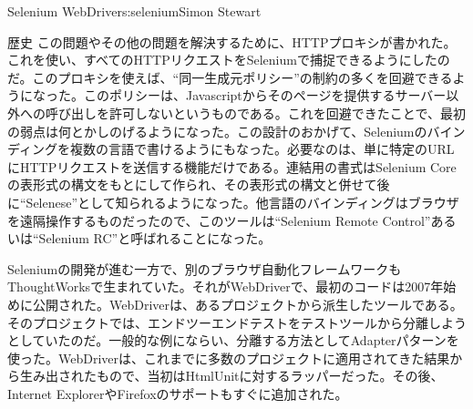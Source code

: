 \begin{aosachapter}{Selenium WebDriver}{s:selenium}{Simon Stewart}
\begin{aosasect1}{歴史}
この問題やその他の問題を解決するために、HTTPプロキシが書かれた。これを使い、すべてのHTTPリクエストをSeleniumで捕捉できるようにしたのだ。このプロキシを使えば、``同一生成元ポリシー''の制約の多くを回避できるようになった。このポリシーは、Javascriptからそのページを提供するサーバー以外への呼び出しを許可しないというものである。これを回避できたことで、最初の弱点は何とかしのげるようになった。この設計のおかげて、Seleniumのバインディングを複数の言語で書けるようにもなった。必要なのは、単に特定のURLにHTTPリクエストを送信する機能だけである。連結用の書式はSelenium Coreの表形式の構文をもとにして作られ、その表形式の構文と併せて後に``Selenese''として知られるようになった。他言語のバインディングはブラウザを遠隔操作するものだったので、このツールは``Selenium Remote Control''あるいは``Selenium RC''と呼ばれることになった。

Seleniumの開発が進む一方で、別のブラウザ自動化フレームワークもThoughtWorksで生まれていた。それがWebDriverで、最初のコードは2007年始めに公開された。WebDriverは、あるプロジェクトから派生したツールである。そのプロジェクトでは、エンドツーエンドテストをテストツールから分離しようとしていたのだ。一般的な例にならい、分離する方法としてAdapterパターンを使った。WebDriverは、これまでに多数のプロジェクトに適用されてきた結果から生み出されたもので、当初はHtmlUnitに対するラッパーだった。その後、Internet ExplorerやFirefoxのサポートもすぐに追加された。


\end{aosasect1}
\end{aosachapter}
